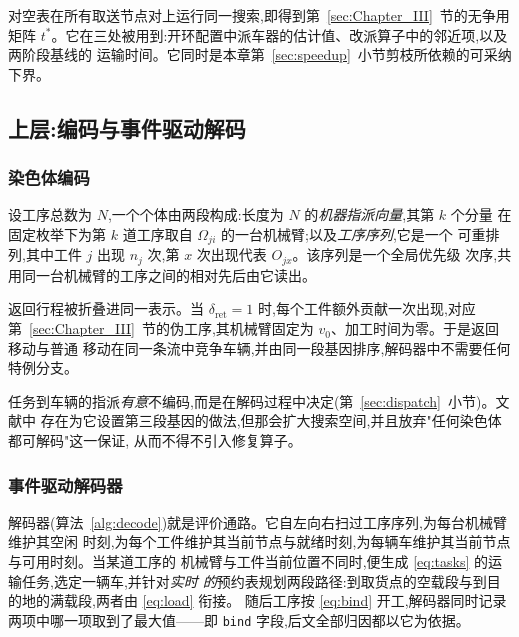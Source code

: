 \documentclass[manuscript,screen,review]{acmart}
\begin{document}
对空表在所有取送节点对上运行同一搜索,即得到第~\ref{sec:Chapter_III}~节的无争用矩阵
$t^{*}$。它在三处被用到:开环配置中派车器的估计值、改派算子中的邻近项,以及两阶段基线的
运输时间。它同时是本章第~\ref{sec:speedup}~小节剪枝所依赖的可采纳下界。

\subsection{上层:编码与事件驱动解码}
\label{sec:upper}

\subsubsection{染色体编码}
设工序总数为 $N$,一个个体由两段构成:长度为 $N$ 的\emph{机器指派向量},其第 $k$ 个分量
在固定枚举下为第 $k$ 道工序取自 $\Omega_{ji}$ 的一台机械臂;以及\emph{工序序列},它是一个
可重排列,其中工件 $j$ 出现 $n_j$ 次,第 $x$ 次出现代表 $O_{jx}$。该序列是一个全局优先级
次序,共用同一台机械臂的工序之间的相对先后由它读出。

返回行程被折叠进同一表示。当 $\delta_{\mathrm{ret}}=1$ 时,每个工件额外贡献一次出现,对应
第~\ref{sec:Chapter_III}~节的伪工序,其机械臂固定为 $v_0$、加工时间为零。于是返回移动与普通
移动在同一条流中竞争车辆,并由同一段基因排序,解码器中不需要任何特例分支。

任务到车辆的指派\emph{有意}不编码,而是在解码过程中决定(第~\ref{sec:dispatch}~小节)。文献中
存在为它设置第三段基因的做法,但那会扩大搜索空间,并且放弃"任何染色体都可解码"这一保证,
从而不得不引入修复算子。

\subsubsection{事件驱动解码器}
解码器(算法~\ref{alg:decode})就是评价通路。它自左向右扫过工序序列,为每台机械臂维护其空闲
时刻,为每个工件维护其当前节点与就绪时刻,为每辆车维护其当前节点与可用时刻。当某道工序的
机械臂与工件当前位置不同时,便生成 \eqref{eq:tasks} 的运输任务,选定一辆车,并针对\emph{实时
的}预约表规划两段路径:到取货点的空载段与到目的地的满载段,两者由 \eqref{eq:load} 衔接。
随后工序按 \eqref{eq:bind} 开工,解码器同时记录两项中哪一项取到了最大值——即 \texttt{bind}
字段,后文全部归因都以它为依据。
\end{document}
